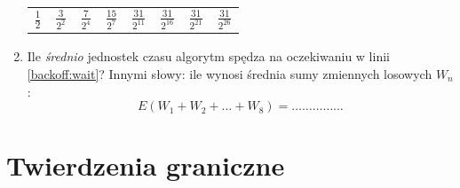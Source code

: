 \documentclass[twoside]{mwart}
\newcommand{\ans}[1]{}
\newcommand{\ans}[1]{\par\emph{Odpowiedź:} #1}
\begin{document}
\begin{enumerate}
{\begin{tabular}{p{1.3cm}|p{1.3cm}|p{1.3cm}|p{1.3cm}|p{1.3cm}|p{1.3cm}|p{1.3cm}|p{1.3cm}}
		\hline
		$\frac{1}{2}$ & $\frac{3}{2^2}$ & $\frac{7}{2^4}$ & $\frac{15}{2^7}$ & $\frac{31}{2^{11}}$ & $\frac{31}{2^{16}}$ & $\frac{31}{2^{21}}$ & $\frac{31}{2^{26}}$
	\end{tabular}
}
\item Ile \emph{średnio} jednostek czasu algorytm spędza na oczekiwaniu w linii \ref{backoff:wait}?
Innymi słowy: ile wynosi średnia sumy zmiennych losowych $W_n$:
\[ E(W_1+W_2+\ldots+W_8)=\ldots\ldots\ldots\ldots\ldots\]
\ans{\[ E(W_1+W_2+\ldots+W_8) = \frac{1}{2^{26}}\left(2^{25} + 3\cdot 2^{24} + 7\cdot 2^{22} + 15\cdot 2^{19} + 31\cdot 2^{15} + 31\cdot 2^{10} + 31\cdot 2^{5} + 31 \right) \]}
\end{enumerate}

\cleardoublepage
\section{Twierdzenia graniczne}
\end{document}
